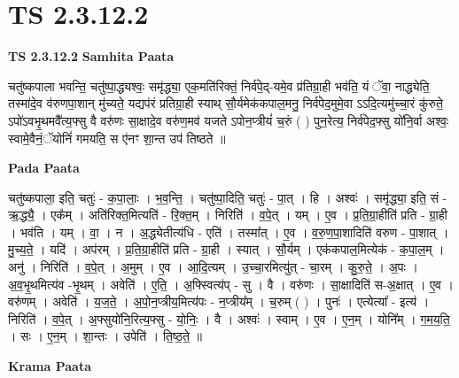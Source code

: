 \documentclass[17pt]{extarticle}
\begin{document}
\section{ TS 2.3.12.2 }

\textbf{TS 2.3.12.2 } \newline
\textbf{Samhita Paata} \newline

चतु॑ष्कपाला भवन्ति॒ चतु॑ष्पा॒द्ध्यश्वः॒ समृ॑द्ध्या॒ एक॒मति॑रिक्तं॒ निर्व॑पे॒द्-यमे॒व प्र॑तिग्रा॒ही भव॑ति॒ यं ॅवा॒ नाद्ध्येति॒ तस्मा॑दे॒व व॑रुणपा॒शान् मु॑च्यते॒ यद्यप॑रं प्रतिग्रा॒ही स्याथ् सौ॒र्यमेक॑कपाल॒मनु॒ निर्व॑पेद॒मुमे॒वा ऽऽदि॒त्यमु॑च्चा॒रं कु॑रुते॒ ऽपो॑ऽवभृ॒थमवै᳚त्य॒फ्सु वै वरु॑णः सा॒क्षादे॒व वरु॑ण॒मव॑ यजते ऽपोन॒प्त्रीयं॑ च॒रुं ( ) पुन॒रेत्य॒ निर्व॑पेद॒फ्सु यो॑नि॒र्वा अश्वः॒ स्वामे॒वैनं॒ॅयोनिं॑ गमयति॒ स ए॑नꣳ शा॒न्त उप॑ तिष्ठते ॥ \newline

\textbf{Pada Paata} \newline

चतु॑ष्कपाला॒ इति॒ चतुः॑ - क॒पा॒लाः॒ । भ॒व॒न्ति॒ । चतु॑ष्पा॒दिति॒ चतुः॑ - पा॒त् । हि । अश्वः॑ । समृ॑द्ध्या॒ इति॒ सं - ऋ॒द्ध्यै॒ । एक᳚म् । अति॑रिक्त॒मित्यति॑ - रि॒क्त॒म् । निरिति॑ । व॒पे॒त् । यम् । ए॒व । प्र॒ति॒ग्रा॒हीति॑ प्रति - ग्रा॒ही । भव॑ति । यम् । वा॒ । न । अ॒द्ध्येतीत्य॑धि - एति॑ । तस्मा᳚त् । ए॒व । व॒रु॒ण॒पा॒शादिति॑ वरुण - पा॒शात् ।   मु॒च्य॒ते॒ । यदि॑ । अप॑रम् । प्र॒ति॒ग्रा॒हीति॑ प्रति -  ग्रा॒ही । स्यात् । सौ॒र्यम् । एक॑कपाल॒मित्येक॑ - क॒पा॒ल॒म् । अनु॑ । निरिति॑ । व॒पे॒त् । अ॒मुम् । ए॒व । आ॒दि॒त्यम् । उ॒च्चा॒रमित्यु॑त् - चा॒रम् । कु॒रु॒ते॒ । अ॒पः । अ॒व॒भृ॒थमित्य॑व -भृ॒थम् । अवेति॑ । ए॒ति॒ । अ॒फ्स्वित्य॑प् - सु । वै । वरु॑णः । सा॒क्षादिति॑ स-अ॒क्षात् । ए॒व । वरु॑णम् । अवेति॑ । य॒ज॒ते॒ । अ॒पो॒न॒प्त्रीय॒मित्य॑पः - न॒प्त्रीय᳚म् । च॒रुम् ( ) । पुनः॑ । एत्येत्या᳚ - इत्य॑ । निरिति॑ । व॒पे॒त् । अ॒फ्सुयो॑नि॒रित्य॒फ्सु - यो॒निः॒ । वै । अश्वः॑ । स्वाम् । ए॒व । ए॒न॒म् । योनि᳚म् । ग॒म॒य॒ति॒ । सः । ए॒न॒म् । शा॒न्तः । उपेति॑ । ति॒ष्ठ॒ते॒ ॥  \newline


\textbf{Krama Paata} \newline
\end{document}
